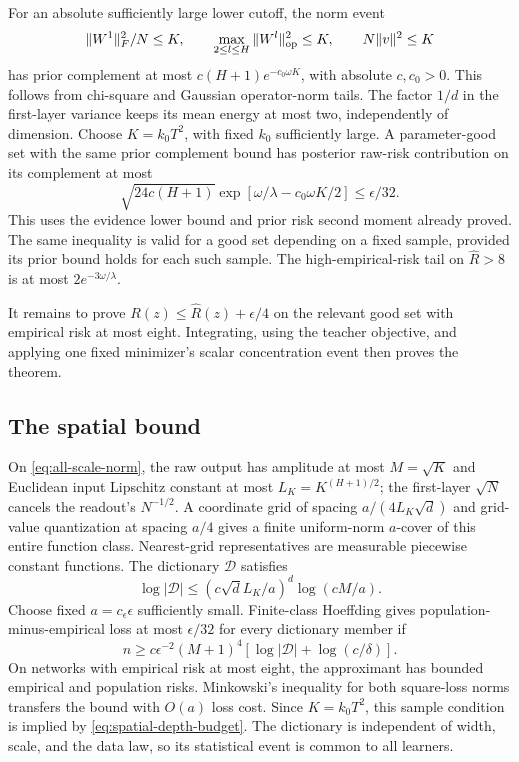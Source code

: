 For an absolute sufficiently large lower cutoff, the norm event
\begin{equation}
 \|W^1\|_F^2/N\le K,\qquad
 \max_{2\le l\le H}\|W^l\|_{\mathrm{op}}^2\le K,\qquad
 N\|v\|^2\le K
 \label{eq:all-scale-norm}
\end{equation}
has prior complement at most $c(H+1)e^{-c_0\omega K}$, with absolute $c,c_0>0$. This follows from chi-square and Gaussian operator-norm tails. The factor $1/d$ in the first-layer variance keeps its mean energy at most two, independently of dimension.
Choose $K=k_0T^2$, with fixed $k_0$ sufficiently large. A parameter-good set with the same prior complement bound has posterior raw-risk contribution on its complement at most
\begin{equation}
 \sqrt{24c(H+1)}\exp[\omega/\lambda-c_0\omega K/2]
 \le\epsilon/32.
 \label{eq:all-scale-bad-risk}
\end{equation}
This uses the evidence lower bound and prior risk second moment already proved. The same inequality is valid for a good set depending on a fixed sample, provided its prior bound holds for each such sample. The high-empirical-risk tail on $\widehat R>8$ is at most $2e^{-3\omega/\lambda}$.

It remains to prove $R(z)\le\widehat R(z)+\epsilon/4$ on the relevant good set with empirical risk at most eight. Integrating, using the teacher objective, and applying one fixed minimizer's scalar concentration event then proves the theorem.

\subsection{The spatial bound}
On \eqref{eq:all-scale-norm}, the raw output has amplitude at most $M=\sqrt K$ and Euclidean input Lipschitz constant at most
$L_K=K^{(H+1)/2}$; the first-layer $\sqrt N$ cancels the readout's $N^{-1/2}$.
A coordinate grid of spacing $a/(4L_K\sqrt d)$ and grid-value quantization at spacing $a/4$ gives a finite uniform-norm $a$-cover of this entire function class. Nearest-grid representatives are measurable piecewise constant functions. The dictionary $\mathcal D$ satisfies
\[
 \log|\mathcal D|\le(c\sqrt d L_K/a)^d\log(cM/a).
\]
Choose fixed $a=c_\epsilon\epsilon$ sufficiently small. Finite-class Hoeffding gives population-minus-empirical loss at most $\epsilon/32$ for every dictionary member if
\[
 n\ge c\epsilon^{-2}(M+1)^4
                 [\log|\mathcal D|+\log(c/\delta)].
\]
On networks with empirical risk at most eight, the approximant has bounded empirical and population risks. Minkowski's inequality for both square-loss norms transfers the bound with $O(a)$ loss cost. Since $K=k_0T^2$, this sample condition is implied by \eqref{eq:spatial-depth-budget}. The dictionary is independent of width, scale, and the data law, so its statistical event is common to all learners.

